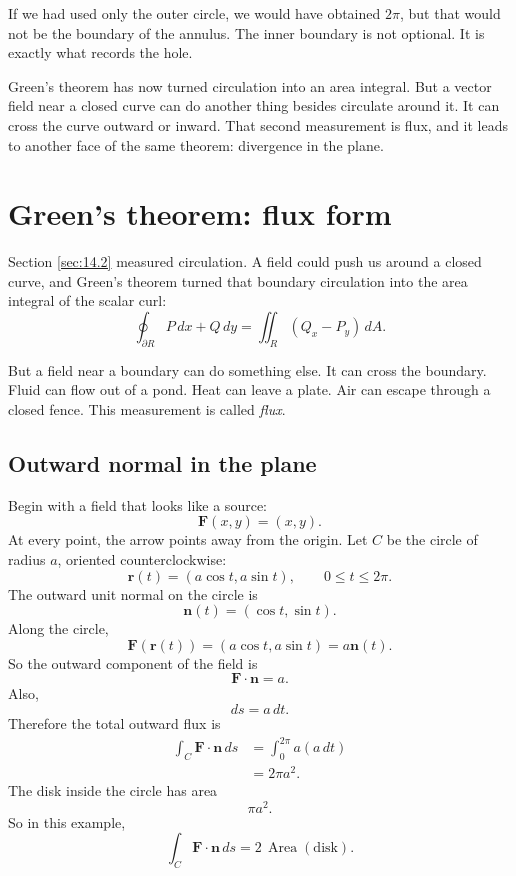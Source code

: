 If we had used only the outer circle, we would have obtained \(2\pi\), but that would
not be the boundary of the annulus.  The inner boundary is not optional.  It is exactly
what records the hole.

Green's theorem has now turned circulation into an area integral.  But a vector field
near a closed curve can do another thing besides circulate around it.  It can cross the
curve outward or inward.  That second measurement is flux, and it leads to another
face of the same theorem: divergence in the plane.
\section{Green's theorem: flux form}
\label{sec:14.3}

Section \ref{sec:14.2} measured circulation.  A field could push us around a closed
curve, and Green's theorem turned that boundary circulation into the area integral of
the scalar curl:
\[
    \oint_{\partial R} P\,dx+Q\,dy
    =
    \iint_R (Q_x-P_y)\,dA.
\]

But a field near a boundary can do something else.  It can cross the boundary.  Fluid
can flow out of a pond.  Heat can leave a plate.  Air can escape through a closed
fence.  This measurement is called \emph{flux}.

\subsection{Outward normal in the plane}

Begin with a field that looks like a source:
\[
    \mathbf F(x,y)=(x,y).
\]
At every point, the arrow points away from the origin.  Let \(C\) be the circle of
radius \(a\), oriented counterclockwise:
\[
    \mathbf r(t)=(a\cos t,a\sin t),
    \qquad
    0\le t\le 2\pi.
\]
The outward unit normal on the circle is
\[
    \mathbf n(t)=(\cos t,\sin t).
\]
Along the circle,
\[
    \mathbf F(\mathbf r(t))=(a\cos t,a\sin t)=a\mathbf n(t).
\]
So the outward component of the field is
\[
    \mathbf F\cdot\mathbf n=a.
\]
Also,
\[
    ds=a\,dt.
\]
Therefore the total outward flux is
\[
\begin{aligned}
    \int_C \mathbf F\cdot\mathbf n\,ds
    &=
    \int_0^{2\pi} a(a\,dt)\\
    &=
    2\pi a^2.
\end{aligned}
\]
The disk inside the circle has area
\[
    \pi a^2.
\]
So in this example,
\[
\boxed{
    \int_C \mathbf F\cdot\mathbf n\,ds
    =
    2\,\operatorname{Area}(\text{disk}).
}
\]

